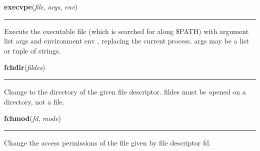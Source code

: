     \label{os:execvpe}

    \vspace{0.5ex}

\hspace{.8\funcindent}\begin{boxedminipage}{\funcwidth}

    \raggedright \textbf{execvpe}(\textit{file}, \textit{args}, \textit{env})

    \vspace{-1.5ex}

    \rule{\textwidth}{0.5\fboxrule}
\setlength{\parskip}{2ex}
    Execute the executable file (which is searched for along \$PATH) with 
    argument list args and environment env , replacing the current process.
    args may be a list or tuple of strings.

\setlength{\parskip}{1ex}
    \end{boxedminipage}

    \label{os:fchdir}

    \vspace{0.5ex}

\hspace{.8\funcindent}\begin{boxedminipage}{\funcwidth}

    \raggedright \textbf{fchdir}(\textit{fildes})

    \vspace{-1.5ex}

    \rule{\textwidth}{0.5\fboxrule}
\setlength{\parskip}{2ex}
    Change to the directory of the given file descriptor.  fildes must be 
    opened on a directory, not a file.

\setlength{\parskip}{1ex}
    \end{boxedminipage}

    \label{os:fchmod}

    \vspace{0.5ex}

\hspace{.8\funcindent}\begin{boxedminipage}{\funcwidth}

    \raggedright \textbf{fchmod}(\textit{fd}, \textit{mode})

    \vspace{-1.5ex}

    \rule{\textwidth}{0.5\fboxrule}
\setlength{\parskip}{2ex}
    Change the access permissions of the file given by file descriptor fd.

\setlength{\parskip}{1ex}
    \end{boxedminipage}

